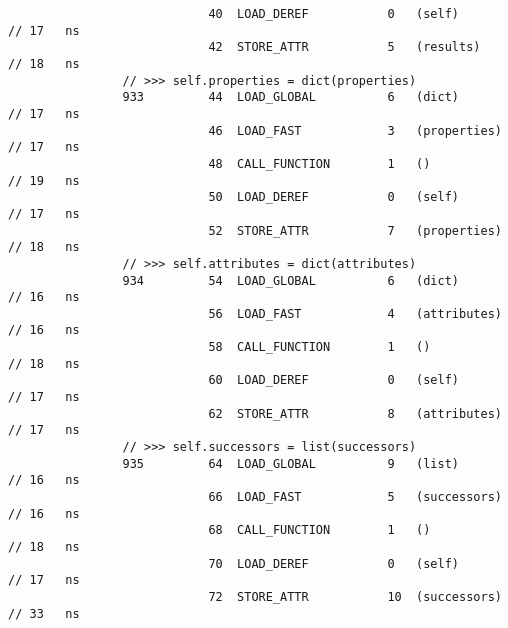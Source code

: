 \begin{code}
\begin{verbatim}
                            40  LOAD_DEREF           0   (self)                                     // 17   ns
                            42  STORE_ATTR           5   (results)                                  // 18   ns
                // >>> self.properties = dict(properties)
                933         44  LOAD_GLOBAL          6   (dict)                                     // 17   ns
                            46  LOAD_FAST            3   (properties)                               // 17   ns
                            48  CALL_FUNCTION        1   ()                                         // 19   ns
                            50  LOAD_DEREF           0   (self)                                     // 17   ns
                            52  STORE_ATTR           7   (properties)                               // 18   ns
                // >>> self.attributes = dict(attributes)
                934         54  LOAD_GLOBAL          6   (dict)                                     // 16   ns
                            56  LOAD_FAST            4   (attributes)                               // 16   ns
                            58  CALL_FUNCTION        1   ()                                         // 18   ns
                            60  LOAD_DEREF           0   (self)                                     // 17   ns
                            62  STORE_ATTR           8   (attributes)                               // 17   ns
                // >>> self.successors = list(successors)
                935         64  LOAD_GLOBAL          9   (list)                                     // 16   ns
                            66  LOAD_FAST            5   (successors)                               // 16   ns
                            68  CALL_FUNCTION        1   ()                                         // 18   ns
                            70  LOAD_DEREF           0   (self)                                     // 17   ns
                            72  STORE_ATTR           10  (successors)                               // 33   ns


\end{verbatim}
\end{code}
